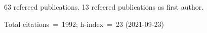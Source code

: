 63 refereed publications. 13 refeered publications as first author.

Total citations~=~1992; h-index~=~23 (2021-09-23)